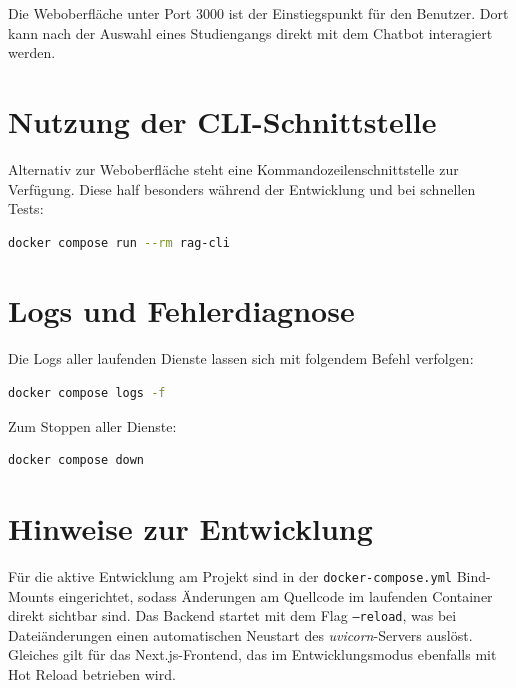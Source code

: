 Die Weboberfläche unter Port 3000 ist der Einstiegspunkt für den Benutzer.
Dort kann nach der Auswahl eines Studiengangs direkt mit dem Chatbot interagiert werden.

\section{Nutzung der CLI-Schnittstelle}

Alternativ zur Weboberfläche steht eine Kommandozeilenschnittstelle
zur Verfügung. Diese half besonders während der Entwicklung und bei schnellen Tests:

\begin{lstlisting}[language=bash, caption={CLI-Modus starten}]
docker compose run --rm rag-cli
\end{lstlisting}

\section{Logs und Fehlerdiagnose}

Die Logs aller laufenden Dienste lassen sich mit folgendem Befehl verfolgen:

\begin{lstlisting}[language=bash, caption={Logs beobachten}]
docker compose logs -f
\end{lstlisting}

Zum Stoppen aller Dienste:

\begin{lstlisting}[language=bash, caption={Alle Dienste stoppen}]
docker compose down
\end{lstlisting}

\section{Hinweise zur Entwicklung}

Für die aktive Entwicklung am Projekt sind in der \texttt{docker-compose.yml}
Bind-Mounts eingerichtet, sodass Änderungen am Quellcode im laufenden Container
direkt sichtbar sind. Das Backend startet mit dem Flag \texttt{--reload}, was
bei Dateiänderungen einen automatischen Neustart des \emph{uvicorn}-Servers
auslöst. Gleiches gilt für das Next.js-Frontend, das im Entwicklungsmodus
ebenfalls mit Hot Reload betrieben wird.
